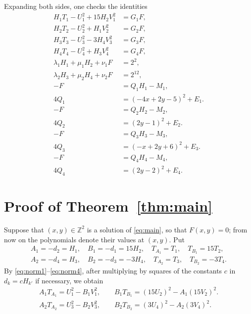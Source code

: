 \documentclass[11pt]{article}
\newcommand{\Z}{\mathbb{Z}}
\begin{document}
Expanding both sides, one checks the identities
\begin{align}
H_{1}T_{1}-U_{1}^2+15H_{2}V_{1}^2&=G_{1}F,\label{eq:norm1}\\
H_{2}T_{2}-U_{2}^2+H_{1}V_{2}^2&=G_{2}F,\label{eq:norm2}\\
H_{3}T_{3}-U_{3}^2-3H_{4}V_{3}^2&=G_{3}F,\label{eq:norm3}\\
H_{4}T_{4}-U_{4}^2+H_{3}V_{4}^2&=G_{4}F,\label{eq:norm4}\\
\lambda_{1}H_{1}+\mu_{1}H_{2}+\nu_{1}F&=2^{2},\label{eq:cross1}\\
\lambda_{2}H_{3}+\mu_{2}H_{4}+\nu_{2}F&=2^{12},\label{eq:cross2}\\
-F&=Q_{1}H_{1}-M_{1},\label{eq:sign1}\\
4Q_{1}&=(-4x+2y-5)^2+E_{1}.\label{eq:sign1b}\\
-F&=Q_{2}H_{2}-M_{2},\label{eq:sign2}\\
4Q_{2}&=(2y-1)^2+E_{2}.\label{eq:sign2b}\\
-F&=Q_{3}H_{3}-M_{3},\label{eq:sign3}\\
4Q_{3}&=(-x+2y+6)^2+E_{3}.\label{eq:sign3b}\\
-F&=Q_{4}H_{4}-M_{4},\label{eq:sign4}\\
4Q_{4}&=(2y-2)^2+E_{4}.\label{eq:sign4b}
\end{align}

\section{Proof of Theorem~\ref{thm:main}}

Suppose that $(x,y)\in\Z^2$ is a solution of \eqref{eq:main}, so that $F(x,y)=0$; from now on the polynomials denote their values at $(x,y)$. Put
\begin{gather*}
A_{1}=-d_{2}=H_{1},\quad B_{1}=-d_{1}=15H_{2},\quad T_{A_{1}}=T_{1},\quad T_{B_{1}}=15T_{2},\\
A_{2}=-d_{4}=H_{3},\quad B_{2}=-d_{3}=-3H_{4},\quad T_{A_{2}}=T_{3},\quad T_{B_{2}}=-3T_{4}.
\end{gather*}
By \eqref{eq:norm1}--\eqref{eq:norm4}, after multiplying by squares of the constants $c$ in $d_k=cH_{k'}$ if necessary, we obtain
\begin{align}
A_{1}T_{A_{1}}=U_{1}^2-B_{1}V_{1}^2,\qquad B_{1}T_{B_{1}}=(15U_{2})^2-A_{1}(15V_{2})^2.\label{eq:AB1}\\
A_{2}T_{A_{2}}=U_{3}^2-B_{2}V_{3}^2,\qquad B_{2}T_{B_{2}}=(3U_{4})^2-A_{2}(3V_{4})^2.\label{eq:AB2}
\end{align}
\end{document}
